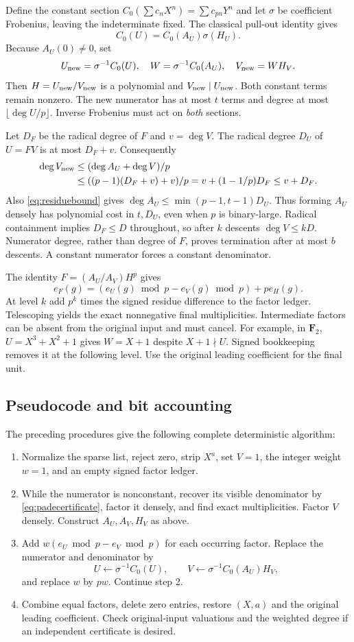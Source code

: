\documentclass[11pt]{article}
\begin{document}
Define the constant section $C_0(\sum c_nX^n)=\sum c_{pn}Y^n$ and
let $\sigma$ be coefficient Frobenius, leaving the indeterminate fixed.
The classical pull-out identity \cite{RY15} gives
\[
 C_0(U)=C_0(A_U)\sigma(H_U).
\]
Because $A_U(0)\ne0$, set
\[
 U_{\rm new}=\sigma^{-1}C_0(U),\quad
 W=\sigma^{-1}C_0(A_U),\quad V_{\rm new}=WH_V.
\]
Then $H=U_{\rm new}/V_{\rm new}$ is a polynomial and
$V_{\rm new}\mid U_{\rm new}$. Both constant terms remain nonzero.
The new numerator has at most $t$ terms and degree at most $\lfloor\deg U/p\rfloor$.
Inverse Frobenius must act on \emph{both} sections.

Let $D_F$ be the radical degree of $F$ and $v=\deg V$. The radical
degree $D_U$ of $U=FV$ is at most $D_F+v$. Consequently
\begin{align}
 \deg V_{\rm new}
 &\le (\deg A_U+\deg V)/p\notag\\
 &\le ((p-1)(D_F+v)+v)/p
 =v+(1-1/p)D_F\le v+D_F.\label{eq:denominator}
\end{align}
Also \eqref{eq:residuebound} gives
$\deg A_U\le\min(p-1,t-1)D_U$. Thus forming $A_U$ densely has
polynomial cost in $t,D_U$, even when $p$ is binary-large.
Radical containment implies $D_F\le D$ throughout, so after $k$
descents $\deg V\le kD$. Numerator degree, rather than degree of $F$,
proves termination after at most $b$ descents. A constant numerator forces
a constant denominator.

The identity $F=(A_U/A_V)H^p$ gives
\[
 e_F(g)=(e_U(g)\bmod p-e_V(g)\bmod p)+p e_H(g).
\]
At level $k$ add $p^k$ times the signed residue difference to the factor
ledger. Telescoping yields the exact nonnegative final multiplicities.
Intermediate factors can be absent from the original input and must cancel.
For example, in $\mathbf F_2$, $U=X^3+X^2+1$ gives $W=X+1$ despite
$X+1\nmid U$. Signed bookkeeping removes it at the following level.
Use the original leading coefficient for the final unit.

\subsection{Pseudocode and bit accounting}
The preceding procedures give the following complete deterministic algorithm:
\begin{enumerate}
\item Normalize the sparse list, reject zero, strip $X^a$, set $V=1$,
the integer weight $w=1$, and an empty signed factor ledger.
\item While the numerator is nonconstant, recover its visible denominator
by \eqref{eq:padecertificate}, factor it densely, and find exact multiplicities.
Factor $V$ densely. Construct $A_U,A_V,H_V$ as above.
\item Add $w(e_U\bmod p-e_V\bmod p)$ for each occurring factor.
Replace the numerator and denominator by
\[
 U\leftarrow\sigma^{-1}C_0(U),\qquad
 V\leftarrow\sigma^{-1}C_0(A_U)H_V,
\]
and replace $w$ by $pw$. Continue step 2.
\item Combine equal factors, delete zero entries, restore $(X,a)$ and
the original leading coefficient. Check original-input valuations and
the weighted degree if an independent certificate is desired.
\end{enumerate}
\end{document}
